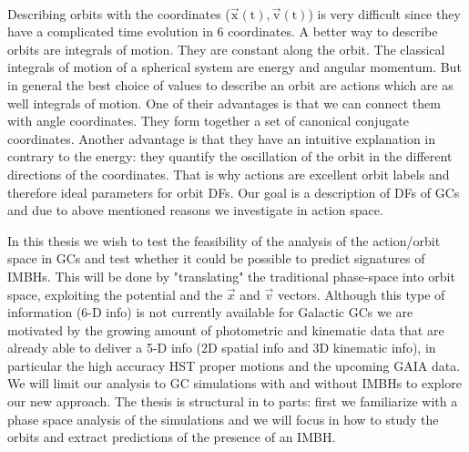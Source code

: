 \\\par Describing orbits with the coordinates (\(\vec{\mathrm{x}}(\mathrm{t}),\vec{\mathrm{v}}(\mathrm{t})\)) is very difficult since they have a complicated time evolution in 6 coordinates. A better way to describe orbits are integrals of motion. They are constant along the orbit. The classical integrals of motion of a spherical system are energy and angular momentum. But in general the best choice of values to describe an orbit are actions which are as well integrals of motion. One of their advantages is that we can connect them with angle coordinates. They form together a set of canonical conjugate coordinates. Another advantage is that they have an intuitive explanation in contrary to the energy: they quantify the oscillation of the orbit in the different directions of the coordinates. That is why actions are excellent orbit labels and therefore ideal parameters for orbit \acp{DF}. Our goal is a description of \acp{DF} of \acp{GC} and due to above mentioned reasons we investigate in action space.
\\\par In this thesis we wish to test the feasibility of the analysis of the action/orbit space in \acp{GC} and test whether it could be possible to predict  signatures of \acp{IMBH}. This will be done by "translating" the traditional phase-space into orbit space, exploiting the potential and the \(\vec{x}\) and \(\vec{v}\) vectors. Although this type of information (6-D info) is not currently available for Galactic \acp{GC} we are motivated by the growing amount of photometric and kinematic data that are already able to deliver a 5-D info (2D spatial info and 3D kinematic info), in particular the high accuracy \ac{HST} proper motions and the upcoming GAIA data. We will limit our analysis to \ac{GC} simulations with and without \acp{IMBH} to explore our new approach. The thesis is structural in to parts: first we familiarize with a phase space analysis of the simulations and we will focus in how to study the orbits and extract predictions of the presence of an \ac{IMBH}.

